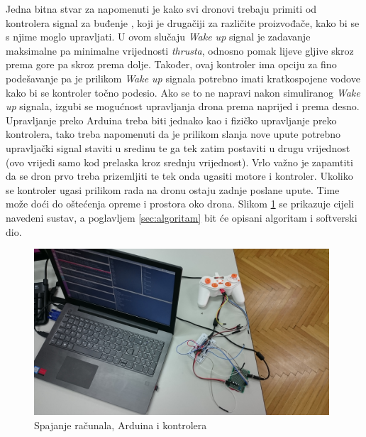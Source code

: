 \documentclass[times, utf8, diplomski]{fer}
\begin{document}
Jedna bitna stvar za napomenuti je kako svi dronovi trebaju primiti od kontrolera signal za buđenje , koji je drugačiji za različite proizvođače, kako bi se s njime moglo upravljati. U ovom slučaju \emph{Wake up} signal je zadavanje maksimalne pa minimalne vrijednosti \emph{thrusta}, odnosno pomak lijeve gljive skroz prema gore pa skroz prema dolje. Također, ovaj kontroler ima opciju za fino podešavanje pa je prilikom \emph{Wake up} signala potrebno imati kratkospojene vodove kako bi se kontroler točno podesio. Ako se to ne napravi nakon simuliranog \emph{Wake up} signala, izgubi se mogućnost upravljanja drona prema naprijed i prema desno. Upravljanje preko Arduina treba biti jednako kao i fizičko upravljanje preko kontrolera, tako treba napomenuti da je prilikom slanja nove upute  potrebno upravljački signal staviti u sredinu te ga tek zatim postaviti u drugu vrijednost (ovo vrijedi samo kod prelaska kroz srednju vrijednost). Vrlo važno je zapamtiti da se dron prvo treba prizemljiti te tek onda ugasiti motore i kontroler. Ukoliko se kontroler ugasi prilikom rada na dronu ostaju zadnje poslane upute. Time može doći do oštećenja opreme i prostora oko drona. Slikom \ref{fig:cijeli sustav} se prikazuje cijeli navedeni sustav, a poglavljem \ref{sec:algoritam} bit će opisani algoritam i softverski dio.
\begin{figure}[htb]
\centering
\includegraphics[width=11cm]{img/spajanje.JPG}
\caption{Spajanje računala, Arduina i kontrolera}
\label{fig:cijeli sustav}
\end{figure}
\end{document}
